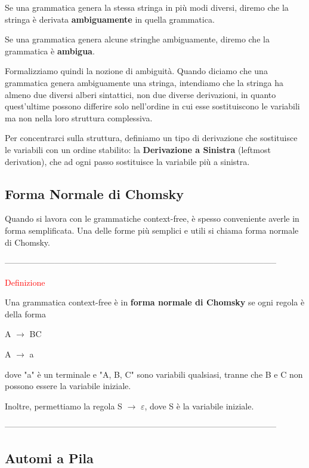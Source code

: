 \documentclass{article}
\begin{document}
Se una grammatica genera la stessa stringa in più modi diversi, diremo che la
stringa è derivata \textbf{ambiguamente} in quella grammatica. 

Se una grammatica genera alcune stringhe ambiguamente, diremo che la grammatica
è \textbf{ambigua}.

Formalizziamo quindi la nozione di ambiguità. Quando diciamo che una grammatica
genera ambiguamente una stringa, intendiamo che la stringa ha almeno due diversi
alberi sintattici, non due diverse derivazioni, in quanto quest'ultime possono
differire solo nell'ordine in cui esse sostituiscono le variabili ma non nella
loro struttura complessiva.

Per concentrarci sulla struttura, definiamo un tipo di derivazione che
sostituisce le variabili con un ordine stabilito: la \textbf{Derivazione a
Sinistra} (leftmost derivation), che ad ogni passo sostituisce la variabile più
a sinistra.

\subsection{Forma Normale di Chomsky}

Quando si lavora con le grammatiche context-free, è spesso conveniente averle in
forma semplificata. Una delle forme più semplici e utili si chiama forma normale
di Chomsky.

--------------------------------------------------------------------------------------------------

\begin{center}
    \textcolor{red}{Definizione}
\end{center}

Una grammatica context-free è in \textbf{forma normale di Chomsky} se ogni
regola è della forma

\begin{center}
    A $\rightarrow$ BC

    A $\rightarrow$ a
\end{center}

dove "a" è un terminale e "A, B, C" sono variabili qualsiasi, tranne che B e C
non possono essere la variabile iniziale.

Inoltre, permettiamo la regola S $\rightarrow$ $\varepsilon$, dove S è la
variabile iniziale.

--------------------------------------------------------------------------------------------------

\subsection{Automi a Pila}
\end{document}
